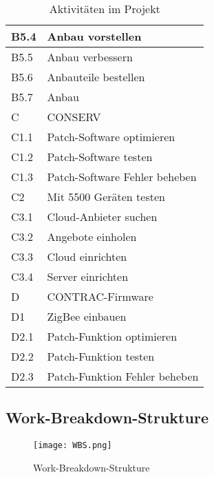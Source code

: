 \begin{table}[H]
\begin{center}
\begin{tabular}{l|l}
            B5.4 & Anbau vorstellen                                    \\ \hline
            B5.5 & Anbau verbessern                                    \\ \hline
            B5.6 & Anbauteile bestellen                                \\ \hline
            B5.7 & Anbau                                               \\ \hline
            C    & CONSERV                                             \\ \hline
            C1.1 & Patch-Software optimieren                           \\ \hline
            C1.2 & Patch-Software testen                               \\ \hline
            C1.3 & Patch-Software Fehler beheben                       \\ \hline
            C2   & Mit 5500 Geräten testen                             \\ \hline
            C3.1 & Cloud-Anbieter suchen                               \\ \hline
            C3.2 & Angebote einholen                                   \\ \hline
            C3.3 & Cloud einrichten                                    \\ \hline
            C3.4 & Server einrichten                                   \\ \hline
            D    & CONTRAC-Firmware                                    \\ \hline
            D1   & ZigBee einbauen                                     \\ \hline
            D2.1 & Patch-Funktion optimieren                           \\ \hline
            D2.2 & Patch-Funktion testen                               \\ \hline
            D2.3 & Patch-Funktion Fehler beheben                       \\
        \end{tabular}
        \caption{Aktivitäten im Projekt}
    \end{center}
\end{table}

\subsection{Work-Breakdown-Strukture}
\begin{figure}[H]
    \begin{center}
        \texttt{[image: WBS.png]}
    \end{center}
    \caption{Work-Breakdown-Strukture}
\end{figure}
